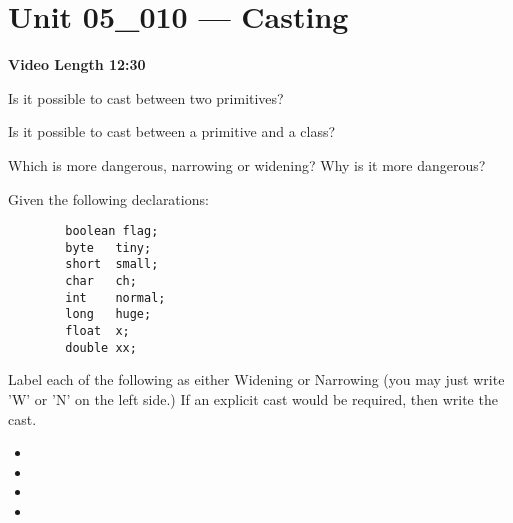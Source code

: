 \documentclass[letterpaper,12pt]{exam}
\newcommand{\unit}{Unit 05}
\begin{document}
\section*{\unit\_010 --- Casting} %
\noindent \textbf{Video Length 12:30}

\begin{questions}
\begin{samepage}
    \question Is it possible to cast between two primitives?
    \vspace{5mm}
\end{samepage}


\begin{samepage}
    \question Is it possible to cast between a primitive and a class?  
    \vspace{5mm}
\end{samepage}

\begin{samepage}
    \question Which is more dangerous, narrowing or widening?  Why is it more dangerous?
    \vspace{5mm}
\end{samepage}

\begin{samepage}
    
    \question Given the following declarations:
    \begin{verbatim}
        boolean flag;  
        byte   tiny;   
        short  small;  
        char   ch;     
        int    normal; 
        long   huge;   
        float  x;      
        double xx;     
      \end{verbatim}

      Label each of the following as either Widening or Narrowing (you may just write 'W' or 'N' on the left side.)  If an explicit cast would be required, then write the cast.
    \begin{itemize}
        \item {}
        \vspace{5mm}
        \item {}
        \vspace{5mm}
        \item {}
        \vspace{5mm}
        \item {}
        \vspace{5mm}
       \end{itemize}
\end{samepage}


\end{questions}
\end{document}
